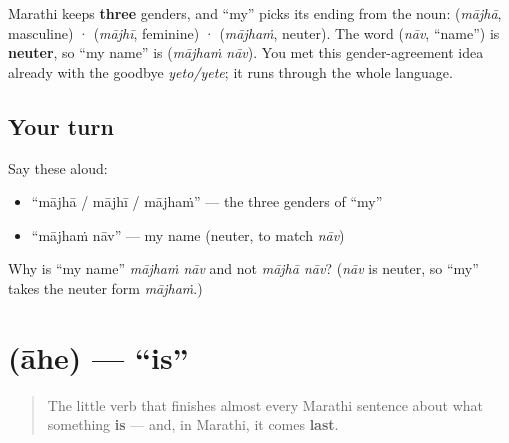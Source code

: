 \begin{grammarlens}[title={Grammar Lens: \textquotedblleft{}my\textquotedblright{} agrees in three genders}]
Marathi keeps \textbf{three} genders, and \textquotedblleft{}my\textquotedblright{} picks its ending from the noun: \textbf{} (\emph{mājhā}, masculine) · \textbf{} (\emph{mājhī}, feminine) · \textbf{} (\emph{mājhaṁ}, neuter). The word \textbf{} (\emph{nāv}, \textquotedblleft{}name\textquotedblright{}) is \textbf{neuter}, so \textquotedblleft{}my name\textquotedblright{} is \textbf{ } (\emph{mājhaṁ nāv}). You met this gender-agreement idea already with the goodbye \emph{yeto/yete}; it runs through the whole language.
\end{grammarlens}

\subsection*{Your turn}
Say these aloud:

\begin{itemize}
\raggedright
  \item \textquotedblleft{}mājhā / mājhī / mājhaṁ\textquotedblright{} — the three genders of \textquotedblleft{}my\textquotedblright{}
  \item \textquotedblleft{}mājhaṁ nāv\textquotedblright{} — my name (neuter, to match \emph{nāv})
\end{itemize}

\begin{tcolorbox}[breakable,colback=teal!4,colframe=teal!35!black,title={Before you move on}]
Why is \textquotedblleft{}my name\textquotedblright{} \emph{mājhaṁ nāv} and not \emph{mājhā nāv}? (\emph{nāv} is neuter, so \textquotedblleft{}my\textquotedblright{} takes the neuter form \emph{mājhaṁ}.)
\end{tcolorbox}
\section[\texorpdfstring{\mr{आहे} (āhe)}{आहे (āhe)}]{ (āhe) — \textquotedblleft{}is\textquotedblright{}}

\label{lesson:MR-C02-aahe}



\begin{quote}
The little verb that finishes almost every Marathi sentence about what something \textbf{is} — and, in Marathi, it comes \textbf{last}.
\end{quote}

